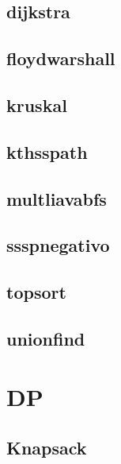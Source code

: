 \documentclass{article}
\begin{document}
\subsection{dijkstra}


\subsection{floydwarshall}


\subsection{kruskal}


\subsection{kthsspath}


\subsection{multliavabfs}


\subsection{ssspnegativo}


\subsection{topsort}


\subsection{unionfind}


\section{DP}
\subsection{Knapsack}

\end{document}

